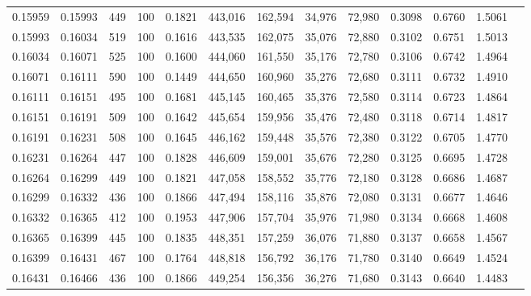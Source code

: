 \begin{tabular}{rrrrrrrrrrrrr}
0.15959 & 0.15993 &   449 & 100 &                                     0.1821 & 443,016 & 162,594 &  34,976 &  72,980 & 0.3098 & 0.6760 & 1.5061 \\
0.15993 & 0.16034 &   519 & 100 &                                     0.1616 & 443,535 & 162,075 &  35,076 &  72,880 & 0.3102 & 0.6751 & 1.5013 \\
0.16034 & 0.16071 &   525 & 100 &                                     0.1600 & 444,060 & 161,550 &  35,176 &  72,780 & 0.3106 & 0.6742 & 1.4964 \\
0.16071 & 0.16111 &   590 & 100 &                                     0.1449 & 444,650 & 160,960 &  35,276 &  72,680 & 0.3111 & 0.6732 & 1.4910 \\
0.16111 & 0.16151 &   495 & 100 &                                     0.1681 & 445,145 & 160,465 &  35,376 &  72,580 & 0.3114 & 0.6723 & 1.4864 \\
0.16151 & 0.16191 &   509 & 100 &                                     0.1642 & 445,654 & 159,956 &  35,476 &  72,480 & 0.3118 & 0.6714 & 1.4817 \\
0.16191 & 0.16231 &   508 & 100 &                                     0.1645 & 446,162 & 159,448 &  35,576 &  72,380 & 0.3122 & 0.6705 & 1.4770 \\
0.16231 & 0.16264 &   447 & 100 &                                     0.1828 & 446,609 & 159,001 &  35,676 &  72,280 & 0.3125 & 0.6695 & 1.4728 \\
0.16264 & 0.16299 &   449 & 100 &                                     0.1821 & 447,058 & 158,552 &  35,776 &  72,180 & 0.3128 & 0.6686 & 1.4687 \\
0.16299 & 0.16332 &   436 & 100 &                                     0.1866 & 447,494 & 158,116 &  35,876 &  72,080 & 0.3131 & 0.6677 & 1.4646 \\
0.16332 & 0.16365 &   412 & 100 &                                     0.1953 & 447,906 & 157,704 &  35,976 &  71,980 & 0.3134 & 0.6668 & 1.4608 \\
0.16365 & 0.16399 &   445 & 100 &                                     0.1835 & 448,351 & 157,259 &  36,076 &  71,880 & 0.3137 & 0.6658 & 1.4567 \\
0.16399 & 0.16431 &   467 & 100 &                                     0.1764 & 448,818 & 156,792 &  36,176 &  71,780 & 0.3140 & 0.6649 & 1.4524 \\
0.16431 & 0.16466 &   436 & 100 &                                     0.1866 & 449,254 & 156,356 &  36,276 &  71,680 & 0.3143 & 0.6640 & 1.4483 \\

\end{tabular}
